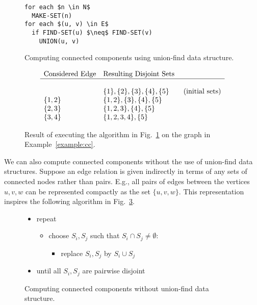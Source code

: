 \documentclass{article}[12pt]
\numberwithin{figure}{section}
\begin{document}
\begin{figure}
\begin{lstlisting}[mathescape]
for each $n \in N$
  MAKE-SET(n)
for each $(u, v) \in E$
  if FIND-SET(u) $\neq$ FIND-SET(v)
    UNION(u, v)
\end{lstlisting}
\caption{Computing connected components using union-find data structure.}
\label{fig:union-find}
\end{figure}

\begin{figure}
\[
\begin{array}{ll}
\mbox{Considered Edge} & \mbox{Resulting Disjoint Sets}\\
\hline\\
& \{1\}, \{2\}, \{3\}, \{4\}, \{5\}\qquad \mbox{(initial sets)}\\
\{1,2\} &  \{1, 2\}, \{3\}, \{4\}, \{5\}\\
\{2,3\} &  \{1, 2, 3\}, \{4\}, \{5\}\\
\{3,4\} &  \{1, 2, 3, 4\}, \{5\}\\
\end{array}
\]
\caption{Result of executing the algorithm in Fig.~\ref{fig:union-find} on the graph in Example~\ref{example:cc}.}
\label{fig:union-find-example}
\end{figure}

We can also compute connected components without the use of union-find data structures.
Suppose an edge relation is given indirectly in terms of any sets of connected nodes rather than pairs.  E.g.,
all pairs of edges between the vertices $u,v,w$ can be represented compactly as the set $\{u,v,w\}$.
This representation inspires the following algorithm in Fig.~\ref{fig:cc-iterative}.

\begin{figure}
\begin{itemize}
\item[] repeat

\begin{itemize}
\item[] choose $S_i, S_j$ such that $S_i \cap S_j \neq \emptyset$:
\begin{itemize}
\item[] replace $S_i, S_j$ by $S_i \cup S_j$
\end{itemize}
\end{itemize}

\item[] until all $S_i, S_j$ are pairwise disjoint
\end{itemize}
\caption{Computing connected components without union-find data structure.}
\label{fig:cc-iterative}
\end{figure}
\end{document}
